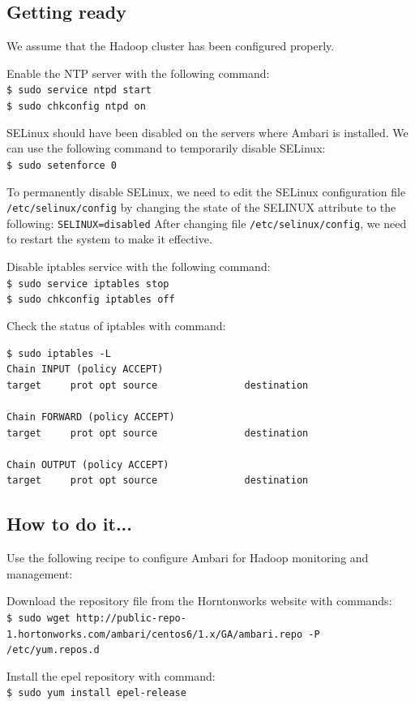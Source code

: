 \subsection*{Getting ready}
We assume that the Hadoop cluster has been configured properly.

Enable the NTP server with the following command: \\
\verb|$ sudo service ntpd start| \\
\verb|$ sudo chkconfig ntpd on|

SELinux should have been disabled on the servers where Ambari is installed. We can use the following command to temporarily disable SELinux: \\
\verb|$ sudo setenforce 0|

To permanently disable SELinux, we need to edit the SELinux configuration file \verb|/etc/selinux/config| by changing the state of the SELINUX attribute to the following:
\verb|SELINUX=disabled|
After changing file \verb|/etc/selinux/config|, we need to restart the system to make it effective.

Disable iptables service with the following command: \\
\verb|$ sudo service iptables stop| \\
\verb|$ sudo chkconfig iptables off|

Check the status of iptables with command: 
\begin{verbatim}
$ sudo iptables -L
Chain INPUT (policy ACCEPT)
target     prot opt source               destination

Chain FORWARD (policy ACCEPT)
target     prot opt source               destination

Chain OUTPUT (policy ACCEPT)
target     prot opt source               destination
\end{verbatim}

\subsection*{How to do it...}
Use the following recipe to configure Ambari for Hadoop monitoring and management:

Download the repository file from the Horntonworks website with commands: \\
\verb|$ sudo wget http://public-repo-1.hortonworks.com/ambari/centos6/1.x/GA/ambari.repo -P /etc/yum.repos.d|

Install the epel repository with command: \\
\verb|$ sudo yum install epel-release |


